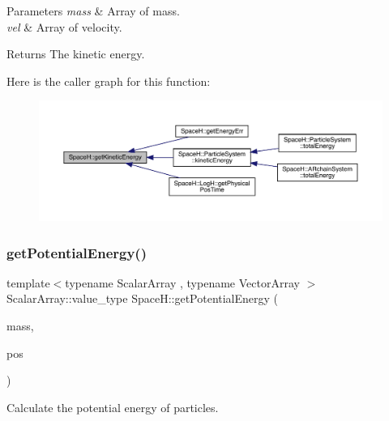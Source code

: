 \begin{DoxyParams}{Parameters}
{\em mass} & Array of mass. \\
\hline
{\em vel} & Array of velocity. \\
\hline
\end{DoxyParams}
\begin{DoxyReturn}{Returns}
The kinetic energy. 
\end{DoxyReturn}
Here is the caller graph for this function\+:
\nopagebreak
\begin{figure}[H]
\begin{center}
\leavevmode
\includegraphics[width=350pt]{namespace_space_h_a18a2979505e69ee2cf1806f782ed436e_icgraph}
\end{center}
\end{figure}
\mbox{\label{namespace_space_h_aecd56c4b16c8c9e47d4083c52db1640a}} 
\subsubsection{\texorpdfstring{get\+Potential\+Energy()}{getPotentialEnergy()}\hspace{0.1cm}{\footnotesize\ttfamily [1/2]}}
{\footnotesize\ttfamily template$<$typename Scalar\+Array , typename Vector\+Array $>$ \\
Scalar\+Array\+::value\+\_\+type Space\+H\+::get\+Potential\+Energy (\begin{DoxyParamCaption}\item[{const Scalar\+Array \&}]{mass,  }\item[{const Vector\+Array \&}]{pos }\end{DoxyParamCaption})}



Calculate the potential energy of particles. 


